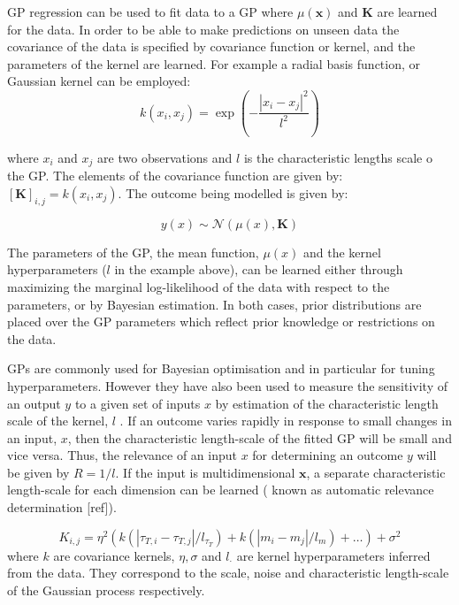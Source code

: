 \documentclass[journal=jacsat,manuscript=article]{achemso}
\begin{document}
GP regression can be used to fit data to a GP where $\mu(\mathbf{x})$ and $\mathbf{K}$ are learned for the data. In order to be able to make predictions on unseen data the covariance of the data is specified by covariance function or kernel, and the parameters of the kernel are learned. For example a radial basis function, or Gaussian kernel can be employed: 
\begin{equation}
    k(x_i, x_j) = \exp\left(-\frac{\left|x_i-x_j\right|^2}{l^2}\right)
\end{equation}

where $x_i$ and $x_j$ are two observations and $l$ is the characteristic lengths scale o the GP. The elements of the covariance function are given by: $[\mathbf{K}]_{i, j} = k(x_i, x_j)$.  The outcome being modelled is given by: 

\begin{equation}
    y(x) \sim \mathcal{N}(\mu(x), \mathbf{K})
\end{equation}

The parameters of the GP, the mean function, $\mu(x)$ and the kernel hyperparameters ($l$ in the example above), can be learned either through maximizing the marginal log-likelihood of the data with respect to the parameters, or by Bayesian estimation. In both cases, prior distributions are placed over the GP parameters which reflect prior knowledge or restrictions on the data.    

GPs are commonly used for Bayesian optimisation and in particular for tuning hyperparameters. However they have also been used to measure the sensitivity of an output $y$ to a given set of inputs $x$ by estimation of the characteristic length scale of the kernel, $l$ \cite{bergstra_jamesbergstra_random_2012}.  If an outcome varies rapidly in response to small changes in an input, $x$, then the characteristic length-scale of the fitted GP will be small and vice versa.  Thus, the relevance of an input $x$ for determining an outcome $y$ will be given by $R=1/l$.  If the input is multidimensional $\mathbf{x}$, a separate characteristic length-scale for each dimension can be learned ( known as automatic relevance determination [ref]).  

\begin{equation}
    K_{i,j} = \eta^{2}\left(k(\left|\tau_{T, i} -\tau_{T, j}\right|/l_{\tau_{T}}) +  k(\left|m_{i} -m_{j}\right|/l_{m}) + \ldots \right) + \sigma^{2}
\end{equation}\label{eqn:kernel}
where $k$ are covariance kernels, $\eta, \sigma$ and $l_{\cdot}$ are kernel hyperparameters inferred from the data. They correspond to the scale, noise and characteristic length-scale of the Gaussian process respectively. 
\end{document}
